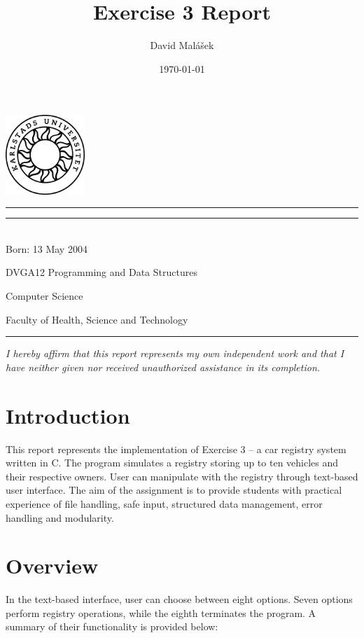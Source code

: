 \documentclass[12pt, a4paper]{article}
\title{Exercise 3 Report}
\author{David Malášek}
\date{\today}
\makeatletter
\newcommand{\birthdate}{13 May 2004}
\newcommand{\affirmation}{I hereby affirm that this report represents my own independent work and that I have neither given nor received unauthorized assistance in its completion.}
\renewcommand{\maketitle}{%
  \bgroup\setlength{\parindent}{0pt}
  \begin{flushleft}

  \vspace*{-1cm}
  \noindent\includegraphics[width=3cm]{kaulogo.jpg}
  \vspace{2cm}

  \hrule\vspace{0.5cm}
  \textbf{\Huge\@title}
  \vspace{0.5cm}\hrule
  
  \vspace{0.5cm}
  \@author \\
  Born: \birthdate
  
  \vspace{0.5cm}
  \@date
  
  \vspace{0.5cm}
  DVGA12 Programming and Data Structures
  
  Computer Science
  
  Faculty of Health, Science and Technology
  
  \vspace{0.5cm}\hrule

  \vspace{1.5cm}
  \textit{\affirmation}

  \end{flushleft}
  \egroup
}
\makeatother
\begin{document}
\maketitle  %

\newpage

\tableofcontents  %

\newpage

\section{Introduction}

This report represents the implementation of Exercise 3 – a car registry system written in C. The program simulates a registry storing up to ten vehicles and their respective owners. User can manipulate with the registry through text-based user interface. The aim of the assignment is to provide students with practical experience of file handling, safe input, structured data management, error handling and modularity.

\section{Overview}

In the text-based interface, user can choose between eight options. Seven options perform registry operations, while the eighth terminates the program. A summary of their functionality is provided below:
\end{document}

